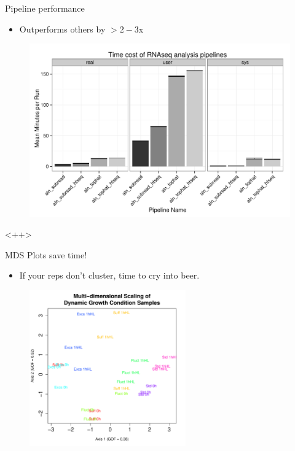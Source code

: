 \documentclass[t]{beamer}
\begin{document}
\begin{frame}{Pipeline performance}
  \begin{itemize}
    \item Outperforms others by $>2-3$x
  \end{itemize}
  \begin{figure}[h]
    \begin{center}
      \includegraphics[width=\textwidth]{img/pltimes.pdf}
    \end{center}
  \end{figure}
\end{frame}<++>


\begin{frame}{MDS Plots save time!}
  \begin{itemize}
    \item If your reps don't cluster, time to cry into beer.
  \end{itemize}
  \begin{figure}[h]
    \begin{center}
      \includegraphics[width=0.6\textwidth]{img/txv-res-plotmds.pdf}
    \end{center}
  \end{figure}
\end{frame}
\end{document}
